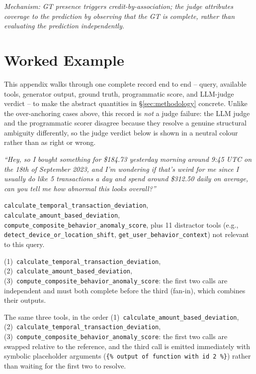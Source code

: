 \smallskip
\noindent\textit{Mechanism: GT presence triggers credit-by-association; the judge attributes coverage to the prediction by observing that the GT is complete, rather than evaluating the prediction independently.}

\section{Worked Example}
\label{app:worked-example}

This appendix walks through one complete record end to end -- query, available tools, generator output, ground truth, programmatic score, and LLM-judge verdict -- to make the abstract quantities in \S\ref{sec:methodology} concrete. Unlike the over-anchoring cases above, this record is \emph{not} a judge failure: the LLM judge and the programmatic scorer disagree because they resolve a genuine structural ambiguity differently, so the judge verdict below is shown in a neutral colour rather than as right or wrong.

\begin{querybox}
\footnotesize
\emph{``Hey, so I bought something for \$184.73 yesterday morning around 9:45 UTC on the 18th of September 2023, and I'm wondering if that's weird for me since I usually do like 5 transactions a day and spend around \$312.50 daily on average, can you tell me how abnormal this looks overall?''}
\end{querybox}

\smallskip
\begin{querybox}
\footnotesize
\texttt{calculate\_temporal\_transaction\_deviation}, \texttt{calculate\_amount\_based\_deviation}, \texttt{compute\_composite\_behavior\_anomaly\_score}, plus 11 distractor tools (e.g., \texttt{detect\_device\_or\_location\_shift}, \texttt{get\_user\_behavior\_context}) not relevant to this query.
\end{querybox}

\smallskip
\begin{gtbox}
\footnotesize
(1)~\texttt{calculate\_temporal\_transaction\_deviation}, (2)~\texttt{calculate\_amount\_based\_deviation}, (3)~\texttt{compute\_composite\_behavior\_anomaly\_score}: the first two calls are independent and must both complete before the third (fan-in), which combines their outputs.
\end{gtbox}

\smallskip
\begin{querybox}
\footnotesize
The same three tools, in the order (1)~\texttt{calculate\_amount\_based\_deviation}, (2)~\texttt{calculate\_temporal\_transaction\_deviation}, (3)~\texttt{compute\_composite\_behavior\_anomaly\_score}: the first two calls are swapped relative to the reference, and the third call is emitted immediately with symbolic placeholder arguments (\texttt{\{\% output of function with id 2 \%\}}) rather than waiting for the first two to resolve.
\end{querybox}


